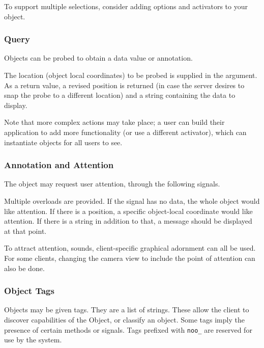 \documentclass[11pt, oneside]{amsart}
\begin{document}
To support multiple selections, consider adding options and activators to your object. 

\subsubsection{Query}
Objects can be probed to obtain a data value or annotation.



The location (object local coordinates) to be probed is supplied in the argument. As a return value, a revised position is returned (in case the server desires to snap the probe to a different location) and a string containing the data to display.

Note that more complex actions may take place; a user can build their application to add more functionality (or use a different activator), which can instantiate objects for all users to see.

\subsubsection{Annotation and Attention}

The object may request user attention, through the following signals.



Multiple overloads are provided. If the signal has no data, the whole object would like attention. If there is a position, a specific object-local coordinate would like attention. If there is a string in addition to that, a message should be displayed at that point.

To attract attention, sounds, client-specific graphical adornment can all be used. For some clients, changing the camera view to include the point of attention can also be done.

\subsubsection{Object Tags}

Objects may be given tags. They are a list of strings. These allow the client to discover capabilities of the Object, or classify an object. Some tags imply the presence of certain methods or signals. Tags prefixed with \texttt{noo\_} are reserved for use by the system.
\end{document}
